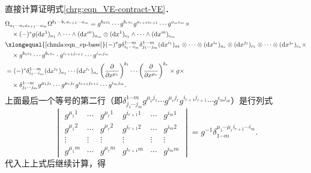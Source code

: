 直接计算证明式\eqref{chrg:eqn_VE-contract-VE}．
\begin{align*}
    &\Omega_{a_1 \cdots a_r a_{r+1} \cdots a_m}
    \Omega^{{b_1 \cdots b_r} a_{r+1} \cdots a_m} 
    = g^{b_{1}c_{1}}\cdots g^{b_{r}c_{r}} g^{a_{r+1}c_{r+1}} \cdots g^{a_{m}c_{m}}\times \\
    &\quad \times (-)^s g ({\rm d}x^1)_{a_1} \wedge \cdots \wedge({\rm d}x^m)_{a_m}
    \otimes ({\rm d}x^1)_{c_1} \wedge \cdots \wedge({\rm d}x^m)_{c_m} \\
    &\xlongequal{\ref{chmla:eqn_ep-base}} (-)^s g
    \delta_{i_1 \cdots i_m}^{1 \cdots m} \delta_{j_1 \cdots j_m}^{1 \cdots m}
    ({\rm d}x^{i_{1}})_{a_{1}} \otimes \cdots \otimes ({\rm d}x^{i_r})_{a_r}  \otimes
    ({\rm d}x^{j_{1}})_{c_{1}} \otimes \cdots \otimes ({\rm d}x^{j_r})_{c_r} \times \\
    &\quad \times g^{b_{1}c_{1}}\cdots g^{b_{r}c_{r}} \cdot g^{i_{r+1}j_{r+1}} \cdots g^{i_{m}j_{m}} \\
    &= %
    (-)^s \delta_{i_1 \cdots i_m}^{1 \cdots m}
    ({\rm d}x^{i_{1}})_{a_{1}}  \cdots  ({\rm d}x^{i_r})_{a_r}
    \left(\frac{\partial }{\partial x^{\mu_1}}\right) ^{b_1} \cdots
    \left(\frac{\partial }{\partial x^{\mu_r}}\right) ^{b_r} \times g \times \\
    & \quad \times \delta_{j_1 \cdots j_m}^{1 \cdots m}
    g^{\mu_{1} j_{1}}\cdots g^{\mu_{r} j_{r}}  g^{i_{r+1}j_{r+1}} \cdots g^{i_{m}j_{m}} .
\end{align*}
上面最后一个等号的第二行（即$\delta_{j_1 \cdots j_m}^{1 \cdots m}
g^{\mu_{1} j_{1}}\cdots g^{\mu_{r} j_{r}}  g^{i_{r+1}j_{r+1}} \cdots g^{i_{m}j_{m}} $）是行列式
\begin{equation}
    \begin{vmatrix}
        g^{\mu_{1} 1} & \cdots & g^{\mu_{r} 1} & g^{i_{r+1} 1} & \cdots & g^{i_{m} 1} \\
        g^{\mu_{1} 2} & \cdots & g^{\mu_{r} 2} & g^{i_{r+1} 2} & \cdots & g^{i_{m} 2} \\
        \vdots & \vdots & \vdots & \vdots & \vdots & \vdots \\
        g^{\mu_{1} m} & \cdots & g^{\mu_{r} m} & g^{i_{r+1} m} & \cdots & g^{i_{m} m}
    \end{vmatrix}
=g^{-1}\delta^{\mu_1 \cdots\mu_r i_{r+1}\cdots i_m}_{1 \cdots m} .
\end{equation}
代入上上式后继续计算，得
